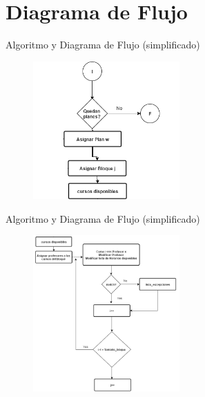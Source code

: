 \documentclass[10pt]{beamer}
\begin{document}
\section{Diagrama de Flujo}
\begin{frame}{Algoritmo y Diagrama de Flujo (simplificado)}{}
\begin{block}{}


\begin{figure}[!h]
\centering
\includegraphics[width=0.50\textwidth]{./AAUgraphics/flux1.png}
\end{figure}

\end{block}
\end{frame}


\begin{frame}{Algoritmo y Diagrama de Flujo (simplificado)}{}
\begin{block}{}


\begin{figure}[!h]
\centering
\includegraphics[width=0.50\textwidth]{./AAUgraphics/flux2.png}
\end{figure}

\end{block}
\end{frame}
\end{document}
